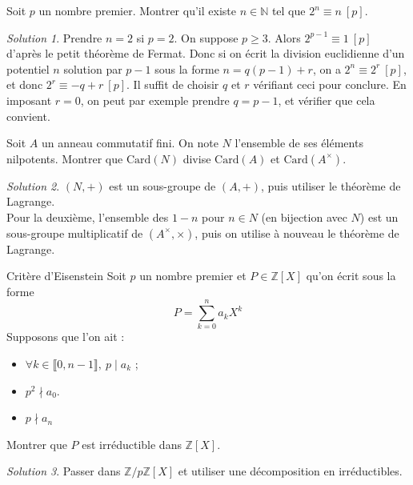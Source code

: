 \documentclass[french]{book}
\newcommand{\N}{\mathbb{N}}
\newcommand{\Z}{\mathbb{Z}}
\newcommand{\card}{\text{Card}}
\theoremstyle{definition}
\theoremstyle{remark}
\newtheorem*{sol}{Solution}
\begin{document}
\begin{exo}[1]{}
	Soit $p$ un nombre premier. Montrer qu'il existe $n\in\N$ tel que $2^n\equiv n\ [p]$.
\end{exo}
\begin{sol}
	Prendre $n=2$ si $p=2$. On suppose $p\geqslant 3$. Alors $2^{p-1}\equiv 1\ [p]$ d'après le petit théorème de Fermat. Donc si on écrit la division euclidienne d'un potentiel $n$ solution par $p-1$ sous la forme $n=q(p-1)+r$, on a $2^n\equiv 2^r\ [p]$, et donc $2^r\equiv -q+r\ [p]$. Il suffit de choisir $q$ et $r$ vérifiant ceci pour conclure. En imposant $r=0$, on peut par exemple prendre $q=p-1$, et vérifier que cela convient.
\end{sol}

\begin{exo}[1]{}
	Soit $A$ un anneau commutatif fini. On note $N$ l'ensemble de ses éléments nilpotents. Montrer que $\card(N)$ divise $\card(A)$ et $\card(A^\times)$.
\end{exo}
\begin{sol}
	$(N,+)$ est un sous-groupe de $(A,+)$, puis utiliser le théorème de Lagrange. \\
	Pour la deuxième, l'ensemble des $1-n$ pour $n\in N$ (en bijection avec $N$) est un sous-groupe multiplicatif de $(A^\times,\times)$, puis on utilise à nouveau le théorème de Lagrange.
\end{sol}

\begin{exo}[1]{Critère d'Eisenstein}
	Soit $p$ un nombre premier et $P\in\Z[X]$ qu'on écrit sous la forme $$P=\sum_{k=0}^{n}a_kX^k$$ Supposons que l'on ait :
	\begin{itemize}
		\item $\forall k\in\llbracket0,n-1\rrbracket,\ p\mid a_k$ ;
		\item $p^2\nmid a_0$.
		\item $p\nmid a_n$
	\end{itemize}
	Montrer que $P$ est irréductible dans $\Z[X]$.
\end{exo}
\begin{sol}
	Passer dans $\Z/p\Z[X]$ et utiliser une décomposition en irréductibles.
\end{sol}
\end{document}

